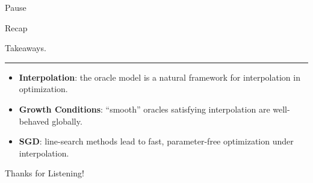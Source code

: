 \documentclass[mathserif,notheorems, hyperref={colorlinks, citecolor=blue, urlcolor=blue, linkcolor=blue}]{beamer}
\begin{document}
    \begin{frame}
        \begin{center}
        \huge Pause
        \end{center}
    \end{frame}
   

    \begin{frame}{Recap}
       \Large 
       \begin{center}
         \Huge Takeaways.

         \vspace{-1ex}
         \rule{0.66\textwidth}{1px}
         \vspace{1ex}
       \end{center}

        \begin{itemize}
            \item \textbf{Interpolation}: the oracle model is a natural framework for interpolation in optimization. 

                \vspace{2ex}
            \item \textbf{Growth Conditions}: ``smooth'' oracles satisfying interpolation are well-behaved globally. 

                \vspace{2ex}
            \item \textbf{SGD}: line-search methods lead to fast, parameter-free optimization under interpolation. 
        \end{itemize}
    \end{frame}
    


    \begin{frame}{}
        \begin{center}
        \huge Thanks for Listening!
        \end{center}
    \end{frame}

\end{document}
